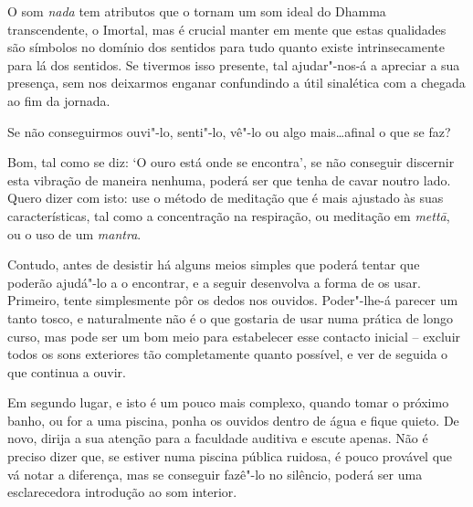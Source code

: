 O som \emph{nada} tem atributos que o tornam um som ideal do Dhamma
transcendente, o Imortal, mas é crucial manter em mente que estas
qualidades são símbolos no domínio dos sentidos para tudo quanto existe
intrinsecamente para lá dos sentidos. Se tivermos isso presente, tal
ajudar"-nos-á a apreciar a sua presença, sem nos deixarmos enganar
confundindo a útil sinalética com a chegada ao fim da jornada.

\smallskip

 Se não conseguirmos ouvi"-lo, senti"-lo, vê"-lo ou algo
mais\ldots{}afinal o que se faz?

 Bom, tal como se diz: `O ouro está onde se encontra', se não
conseguir discernir esta vibração de maneira nenhuma, poderá ser que
tenha de cavar noutro lado. Quero dizer com isto: use o método de
meditação que é mais ajustado às suas características, tal como a
concentração na respiração, ou meditação em \emph{mettā}, ou o uso de um
\emph{mantra}.

Contudo, antes de desistir há alguns meios simples que poderá tentar que
poderão ajudá"-lo a o encontrar, e a seguir desenvolva a forma de os
usar. Primeiro, tente simplesmente pôr os dedos nos ouvidos. Poder"-lhe-á
parecer um tanto tosco, e naturalmente não é o que gostaria de usar numa
prática de longo curso, mas pode ser um bom meio para estabelecer esse
contacto inicial -- excluir todos os sons exteriores tão completamente
quanto possível, e ver de seguida o que continua a ouvir.

Em segundo lugar, e isto é um pouco mais complexo, quando tomar o
próximo banho, ou for a uma piscina, ponha os ouvidos dentro de água e
fique quieto. De novo, dirija a sua atenção para a faculdade auditiva e
escute apenas. Não é preciso dizer que, se estiver numa piscina pública
ruidosa, é pouco provável que vá notar a diferença, mas se conseguir
fazê"-lo no silêncio, poderá ser uma esclarecedora introdução ao som
interior.

